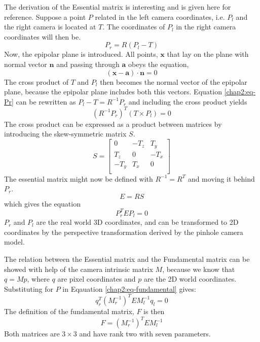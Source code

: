 The derivation of the Essential matrix is interesting and is given here for reference.
Suppose a point $P$ related in the left camera coordinates, i.e. $P_l$ and the right
camera is located at $T$. The coordinates of $P_l$ in the right camera coordinates will
then be.
\begin{equation}
    \label{chap2:eq-Pr}
    P_r = R (P_l - T)
\end{equation}
Now, the epipolar plane is introduced. All points, $\mathbf{x}$ that lay on the plane with normal vector
$\mathbf{n}$ and passing through $\mathbf{a}$ obeys the equation,
\begin{equation*}
    (\mathbf{x} - \mathbf{a}) \cdot \mathbf{n} = 0
\end{equation*}
The cross product of $T$ and $P_l$ then becomes the normal vector of the epipolar plane,
because the epipolar plane includes both this vectors. Equation \eqref{chap2:eq-Pr} can be
rewritten as $P_l - T = R^{-1} P_r$ and including the cross product yields 
\begin{equation}
    (R^{-1} P_r)^T (T \times P_l) = 0
\end{equation}
The cross product can be expressed as a product between matrices by introducing the
skew-symmetric matrix $S$. \cite{modsim}
\begin{equation}
    S = \left [ \begin{array}{ccc}
                0 & -T_z & T_y \\
                T_z & 0 & -T_x \\
                -T_y & T_x & 0 \\ \end{array} \right]
\end{equation}
The essential matrix might now be defined with $R^{-1} = R^T$ and moving it behind $P_r$.
\begin{equation}
    E = RS 
\end{equation}
which gives the equation
\begin{equation}
    \label{chap2:eq-fundamental}
    P_r^T E P_l = 0
\end{equation}
$P_r$ and $P_l$ are the real world 3D coordinates, and can be transformed to 2D
coordinates by the perspective transformation derived by the pinhole camera model. 

The relation between the Essential matrix and the Fundamental matrix can be showed with
help of the camera intrinsic matrix $M$, because we know that $q = Mp$, where $q$ are
pixel coordinates and $p$ are the 2D world coordinates. Substituting for $P$ in Eqauation
\eqref{chap2:eq-fundamental} gives: \cite{openCV}
\begin{equation}
    q_r^T(M_r^{-1})^T E M_l^{-1} q_l = 0
\end{equation}
The definition of the fundamental matrix, $F$ is then
\begin{equation}
    F = (M_r^{-1})^T E M_l^{-1}
\end{equation}
Both matrices are $3\times3$ and have rank two with seven parameters.


